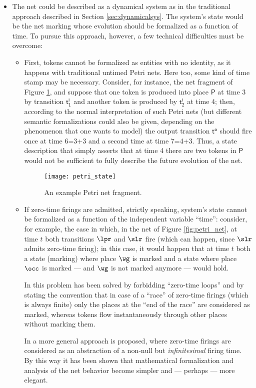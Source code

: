 \begin{itemize}
\item The net could be described as a dynamical system as in the traditional 
approach described in Section \ref{sec:dynamicalsys}. The system's state would be 
the net marking whose evolution should be formalized as a function 
of time. To pursue this approach, however, a few technical difficulties 
must be overcome:
  \begin{itemize}
  \item First, tokens cannot be formalized as entities with no identity, 
	 as it happens with traditional untimed Petri nets. Here too, 
	 some kind of time stamp may be necessary. Consider, for instance, 
	 the net fragment of Figure \ref{fig:petri_state}, and suppose that one token is 
	 produced into place $\mathsf{P}$ at time 3 by transition $\mathsf{t^i_1}$ and another 
	 token is produced by $\mathsf{t^i_2}$ at time 4; then, according to the normal 
	 interpretation of such Petri nets (but different semantic formalizations 
	 could also be given, depending on the phenomenon that one wants 
	 to model) the output transition $\mathsf{t^o}$ should fire once at time 6=3+3 
	 and a second time at time 7=4+3. Thus, a state description that 
	 simply asserts that at time 4 there are two tokens in $\mathsf{P}$ would 
	 not be sufficient to fully describe the future evolution of the 
	 net.
\begin{figure}[htb!]
	 \centering
	 \texttt{[image: petri\_state]}
	 \caption{An example Petri net fragment.}
	 \label{fig:petri_state}
\end{figure}

  \item If zero-time firings are admitted, strictly speaking, system's 
	 state cannot be formalized as a function of the independent variable 
	 ``time'': consider, for example, the case in which, in the net 
	 of Figure \ref{fig:petri_net}, at time $t$ both transitions $\lpr$ and $\slr$ fire
	 (which can happen, since $\slr$ admits zero-time firing); in this case, it 
	 would happen that at time $t$ both a state (marking) where 
	 place $\wg$ is marked and a state where place $\occ$ is marked 
	 --- and $\wg$ is not marked anymore --- would hold.

	 In \cite{FMM94} this problem has been solved by forbidding ``zero-time 
	 loops'' and by stating the convention that in case of a ``race'' 
	 of zero-time firings (which is always finite) only the places 
	 at the ``end of the race'' are considered as marked, whereas tokens 
	 flow instantaneously through other places without marking them. 

	 In \cite{GMM99} a more general approach is proposed, where zero-time 
	 firings are considered as an abstraction of a non-null but \emph{infinitesimal} 
	 firing time. By this way it has been shown that mathematical 
	 formalization and analysis of the net behavior become simpler 
	 and --- perhaps --- more elegant.
    \end{itemize}
\end{itemize}

